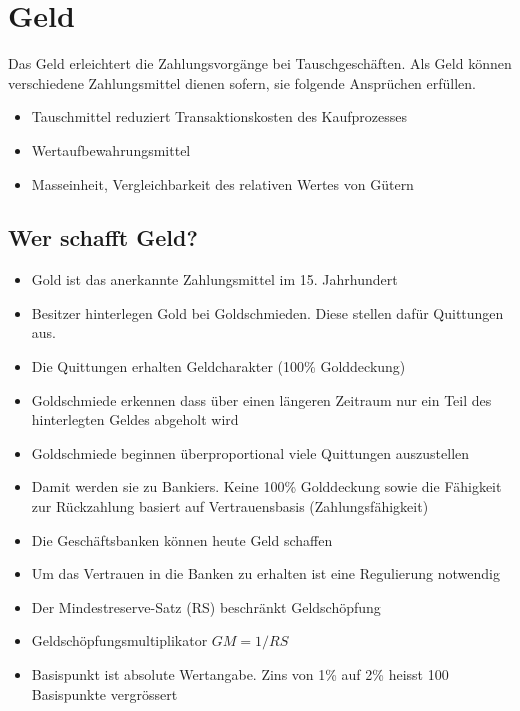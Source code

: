 \section{Geld}
Das Geld erleichtert die Zahlungsvorgänge bei Tauschgeschäften. Als Geld können verschiedene Zahlungsmittel dienen sofern, sie folgende Ansprüchen erfüllen.
\begin{itemize}
	\item Tauschmittel reduziert Transaktionskosten des Kaufprozesses
	\item Wertaufbewahrungsmittel
	\item Masseinheit, Vergleichbarkeit des relativen Wertes von Gütern
\end{itemize}
\subsection{Wer schafft Geld?}
\begin{itemize}
	\item Gold ist das anerkannte Zahlungsmittel im 15. Jahrhundert
	\item Besitzer hinterlegen Gold bei Goldschmieden. Diese stellen dafür Quittungen aus.
	\item Die Quittungen erhalten Geldcharakter (100\% Golddeckung)
	\item Goldschmiede erkennen dass über einen längeren Zeitraum nur ein Teil des hinterlegten Geldes abgeholt wird
	\item Goldschmiede beginnen überproportional viele Quittungen auszustellen
	\item Damit werden sie zu Bankiers. Keine 100\% Golddeckung sowie die Fähigkeit zur Rückzahlung basiert auf Vertrauensbasis (Zahlungsfähigkeit)
	\item Die Geschäftsbanken können heute Geld schaffen
	\item Um das Vertrauen in die Banken zu erhalten ist eine Regulierung notwendig
	\item Der Mindestreserve-Satz (RS) beschränkt Geldschöpfung
	\item Geldschöpfungsmultiplikator $GM= 1/RS$
	\item Basispunkt ist absolute Wertangabe.
	\subitem Zins von 1\% auf 2\% heisst 100 Basispunkte vergrössert
\end{itemize}
